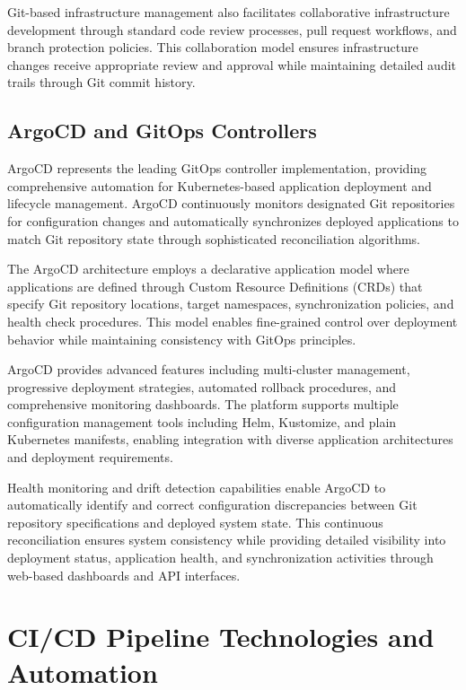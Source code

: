 Git-based infrastructure management also facilitates collaborative infrastructure development through standard code review processes, pull request workflows, and branch protection policies. This collaboration model ensures infrastructure changes receive appropriate review and approval while maintaining detailed audit trails through Git commit history.

\subsection{ArgoCD and GitOps Controllers}

ArgoCD represents the leading GitOps controller implementation, providing comprehensive automation for Kubernetes-based application deployment and lifecycle management. ArgoCD continuously monitors designated Git repositories for configuration changes and automatically synchronizes deployed applications to match Git repository state through sophisticated reconciliation algorithms.

The ArgoCD architecture employs a declarative application model where applications are defined through Custom Resource Definitions (CRDs) that specify Git repository locations, target namespaces, synchronization policies, and health check procedures. This model enables fine-grained control over deployment behavior while maintaining consistency with GitOps principles.

ArgoCD provides advanced features including multi-cluster management, progressive deployment strategies, automated rollback procedures, and comprehensive monitoring dashboards. The platform supports multiple configuration management tools including Helm, Kustomize, and plain Kubernetes manifests, enabling integration with diverse application architectures and deployment requirements.

Health monitoring and drift detection capabilities enable ArgoCD to automatically identify and correct configuration discrepancies between Git repository specifications and deployed system state. This continuous reconciliation ensures system consistency while providing detailed visibility into deployment status, application health, and synchronization activities through web-based dashboards and API interfaces.

\section{CI/CD Pipeline Technologies and Automation}

